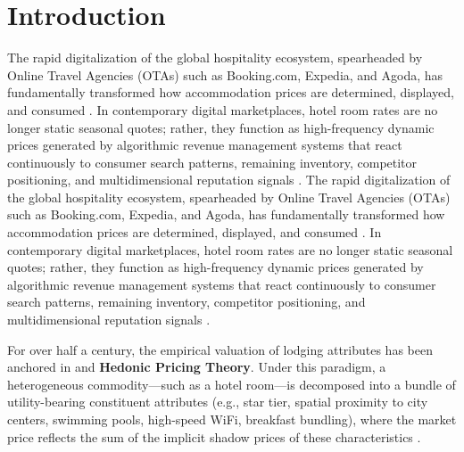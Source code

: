 \documentclass[11pt,a4paper]{article}
\begin{document}
\newpage

\section{Introduction}

The rapid digitalization of the global hospitality ecosystem, spearheaded by Online Travel Agencies (OTAs) such as Booking.com, Expedia, and Agoda, has fundamentally transformed how accommodation prices are determined, displayed, and consumed \citep{viglia2016, sun2022}. In contemporary digital marketplaces, hotel room rates are no longer static seasonal quotes; rather, they function as high-frequency dynamic prices generated by algorithmic revenue management systems that react continuously to consumer search patterns, remaining inventory, competitor positioning, and multidimensional reputation signals \citep{li2019}.
The rapid digitalization of the global hospitality ecosystem, spearheaded by Online Travel Agencies (OTAs) such as Booking.com, Expedia, and Agoda, has fundamentally transformed how accommodation prices are determined, displayed, and consumed \citep{abrate2016, viglia2016}. In contemporary digital marketplaces, hotel room rates are no longer static seasonal quotes; rather, they function as high-frequency dynamic prices generated by algorithmic revenue management systems that react continuously to consumer search patterns, remaining inventory, competitor positioning, and multidimensional reputation signals \citep{li2018}.

For over half a century, the empirical valuation of lodging attributes has been anchored in \citet{rosen1974} and \citet{lancaster1966} \textbf{Hedonic Pricing Theory}. Under this paradigm, a heterogeneous commodity---such as a hotel room---is decomposed into a bundle of utility-bearing constituent attributes (e.g., star tier, spatial proximity to city centers, swimming pools, high-speed WiFi, breakfast bundling), where the market price reflects the sum of the implicit shadow prices of these characteristics \citep{espinet2003, thrane2007}.
\end{document}
